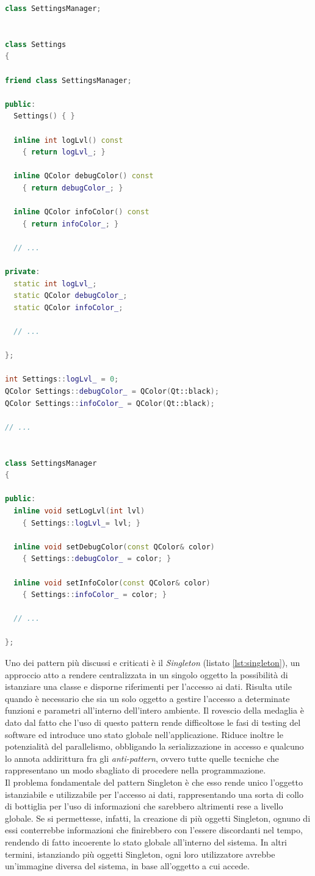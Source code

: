 \begin{lstlisting}[basicstyle=\small,language=C++,caption={Pattern Monostate in QSapecNG},float,label={lst:qmono},captionpos=b,frame=lines]
class SettingsManager;


class Settings
{

friend class SettingsManager;

public:
  Settings() { }

  inline int logLvl() const
    { return logLvl_; }

  inline QColor debugColor() const
    { return debugColor_; }

  inline QColor infoColor() const
    { return infoColor_; }

  // ...

private:
  static int logLvl_;
  static QColor debugColor_;
  static QColor infoColor_;

  // ...

};

int Settings::logLvl_ = 0;
QColor Settings::debugColor_ = QColor(Qt::black);
QColor Settings::infoColor_ = QColor(Qt::black);

// ...


class SettingsManager
{

public:
  inline void setLogLvl(int lvl)
    { Settings::logLvl_= lvl; }

  inline void setDebugColor(const QColor& color)
    { Settings::debugColor_ = color; }

  inline void setInfoColor(const QColor& color)
    { Settings::infoColor_ = color; }

  // ...

};
\end{lstlisting}

Uno dei pattern più discussi e criticati è il \textit{Singleton} (listato \ref{lst:singleton}), un approccio atto a rendere centralizzata in un singolo oggetto la possibilità di istanziare una classe e disporne riferimenti per l'accesso ai dati. Risulta utile quando è necessario che sia un solo oggetto a gestire l'accesso a determinate funzioni e parametri all'interno dell'intero ambiente. Il rovescio della medaglia è dato dal fatto che l'uso di questo pattern rende difficoltose le fasi di testing del software ed introduce uno stato globale nell'applicazione. Riduce inoltre le potenzialità del parallelismo, obbligando la serializzazione in accesso e qualcuno lo annota addirittura fra gli \textit{anti-pattern}, ovvero tutte quelle tecniche che rappresentano un modo sbagliato di procedere nella programmazione.\\
Il problema fondamentale del pattern Singleton è che esso rende unico l'oggetto istanziabile e utilizzabile per l'accesso ai dati, rappresentando una sorta di collo di bottiglia per l'uso di informazioni che sarebbero altrimenti rese a livello globale. Se si permettesse, infatti, la creazione di più oggetti Singleton, ognuno di essi conterrebbe informazioni che finirebbero con l'essere discordanti nel tempo, rendendo di fatto incoerente lo stato globale all'interno del sistema. In altri termini, istanziando più oggetti Singleton, ogni loro utilizzatore avrebbe un'immagine diversa del sistema, in base all'oggetto a cui accede.

